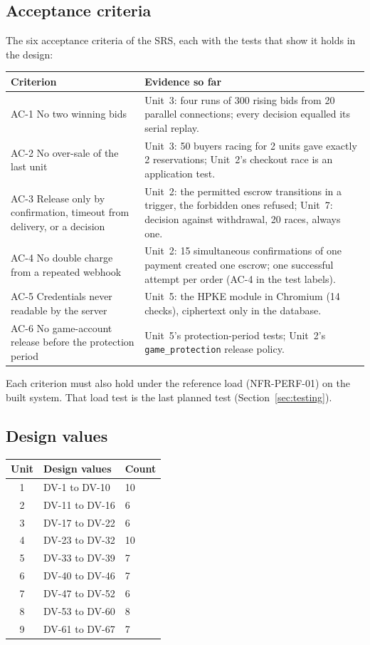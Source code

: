 \documentclass[11pt,a4paper]{article}
\newenvironment{dtable}[1]{\small\begin{longtable}{#1}}{\end{longtable}}
\begin{document}
\subsection{Acceptance criteria}
The six acceptance criteria of the SRS, each with the tests that show it holds in the design:
\begin{dtable}{@{}>{\raggedright\arraybackslash}p{4.8cm}>{\raggedright\arraybackslash}p{10.4cm}@{}}
\toprule
\textbf{Criterion} & \textbf{Evidence so far} \\ \midrule \endhead
AC-1 No two winning bids & Unit~3: four runs of 300 rising bids from 20 parallel connections; every decision equalled its serial replay. \\
AC-2 No over-sale of the last unit & Unit~3: 50 buyers racing for 2 units gave exactly 2 reservations; Unit~2's checkout race is an application test. \\
AC-3 Release only by confirmation, timeout from delivery, or a decision & Unit~2: the permitted escrow transitions in a trigger, the forbidden ones refused; Unit~7: decision against withdrawal, 20 races, always one. \\
AC-4 No double charge from a repeated webhook & Unit~2: 15 simultaneous confirmations of one payment created one escrow; one successful attempt per order (AC-4 in the test labels). \\
AC-5 Credentials never readable by the server & Unit~5: the HPKE module in Chromium (14 checks), ciphertext only in the database. \\
AC-6 No game-account release before the protection period & Unit~5's protection-period tests; Unit~2's \texttt{game\_\allowbreak protection} release policy. \\
\bottomrule
\end{dtable}
Each criterion must also hold under the reference load (NFR-PERF-01) on the built system. That load test is the last planned test (Section~\ref{sec:testing}).

\subsection{Design values}
\begin{dtable}{@{}cll@{}}
\toprule
\textbf{Unit} & \textbf{Design values} & \textbf{Count} \\ \midrule \endhead
1 & DV-1 to DV-10 & 10 \\
2 & DV-11 to DV-16 & 6 \\
3 & DV-17 to DV-22 & 6 \\
4 & DV-23 to DV-32 & 10 \\
5 & DV-33 to DV-39 & 7 \\
6 & DV-40 to DV-46 & 7 \\
7 & DV-47 to DV-52 & 6 \\
8 & DV-53 to DV-60 & 8 \\
9 & DV-61 to DV-67 & 7 \\
\bottomrule
\end{dtable}
\end{document}

